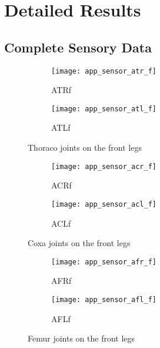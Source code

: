 \chapter{Detailed Results} \label{app:detailed_results}

\section{Complete Sensory Data}

\begin{figure}[H]
\centering
\begin{subfigure}{0.48\textwidth}
  \centering
  \texttt{[image: app\_sensor\_atr\_f]}
  \caption{ATRf}
  \label{fig:app_atr_f}
\end{subfigure}
\begin{subfigure}{0.48\textwidth}
  \centering
  \texttt{[image: app\_sensor\_atl\_f]}
  \caption{ATLf}
  \label{fig:app_atl_f}
\end{subfigure}
\caption{Thoraco joints on the front legs}
\label{fig:app_at_f}
\end{figure}

\begin{figure}[H]
\centering
\begin{subfigure}{0.48\textwidth}
  \centering
  \texttt{[image: app\_sensor\_acr\_f]}
  \caption{ACRf}
  \label{fig:app_acr_f}
\end{subfigure}
\begin{subfigure}{0.48\textwidth}
  \centering
  \texttt{[image: app\_sensor\_acl\_f]}
  \caption{ACLf}
  \label{fig:app_acl_f}
\end{subfigure}
\caption{Coxa joints on the front legs}
\label{fig:app_ac_f}
\end{figure}

\begin{figure}[H]
\centering
\begin{subfigure}{0.48\textwidth}
  \centering
  \texttt{[image: app\_sensor\_afr\_f]}
  \caption{AFRf}
  \label{fig:app_afr_f}
\end{subfigure}
\begin{subfigure}{0.48\textwidth}
  \centering
  \texttt{[image: app\_sensor\_afl\_f]}
  \caption{AFLf}
  \label{fig:app_afl_f}
\end{subfigure}
\caption{Femur joints on the front legs}
\label{fig:app_af_f}
\end{figure}

